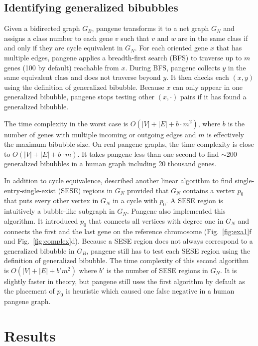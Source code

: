 \documentclass[webpdf,contemporary,large,namedate]{oup-authoring-template}%
\begin{document}
\subsection{Identifying generalized bibubbles}

Given a bidirected graph $G_B$, pangene transforms it to a net graph $G_N$
and assigns a class number to each gene $v$ such that $v$ and $w$ are in the same class if and only if they are cycle equivalent in $G_N$.
For each oriented gene $x$ that has multiple edges,
pangene applies a breadth-first search (BFS) to traverse up to $m$ genes (100 by default) reachable from $x$.
During BFS, pangene collects $y$ in the same equivalent class and does not traverse beyond $y$.
It then checks each $(x,y)$ using the definition of generalized bibubble.
Because $x$ can only appear in one generalized bibubble, pangene stops testing other $(x,\cdot)$ pairs
if it has found a generalized bibubble.

The time complexity in the worst case is $O(|V|+|E|+b\cdot m^2)$, where $b$ is the number of genes with multiple incoming or outgoing edges
and $m$ is effectively the maximum bibubble size.
On real pangene graphs, the time complexity is close to $O(|V|+|E|+b\cdot m)$.
It takes pangene less than one second to find $\sim$200 generalized bibubbles
in a human graph including 20 thousand genes.

In addition to cycle equivalence, \citet{DBLP:conf/pldi/JohnsonPP94}
described another linear algorithm to find single-entry-single-exist (SESE) regions in $G_N$
provided that $G_N$ contains a vertex $p_0$ that puts every other vertex in $G_N$ in a cycle with $p_0$.
A SESE region is intuitively a bubble-like subgraph in $G_N$.
Pangene also implemented this algorithm.
It introduced $p_0$ that connects all vertices with degree one in $G_N$
and connects the first and the last gene on the reference chromosome (Fig.~\ref{fig:exa1}f and Fig.~\ref{fig:complex}d).
Because a SESE region does not always correspond to a generalized bibubble in $G_B$,
pangene still has to test each SESE region using the definition of generalized bibubble.
The time complexity of this second algorithm is $O(|V|+|E|+b'm^2)$ where $b'$ is the number of
SESE regions in $G_N$.
It is slightly faster in theory,
but pangene still uses the first algorithm by default
as the placement of $p_0$ is heuristic which caused one false negative in a human pangene graph.

\section{Results}
\end{document}
